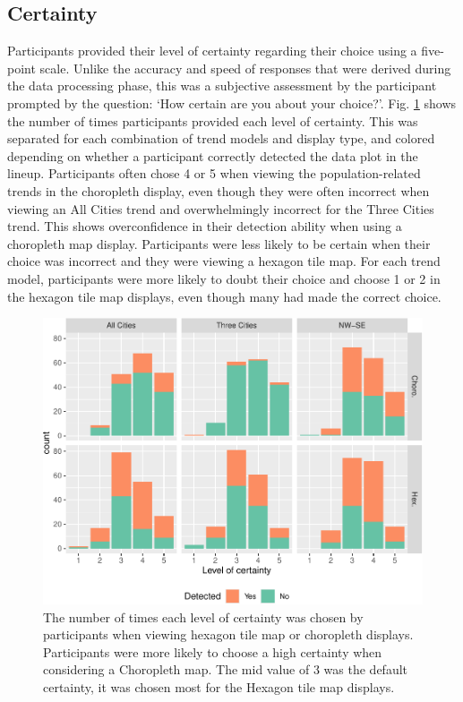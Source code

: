 \documentclass[times, doublespace]{anzsauth}
\begin{document}
\subsection{Certainty}\label{certainty}

Participants provided their level of certainty regarding their choice
using a five-point scale. Unlike the accuracy and speed of responses
that were derived during the data processing phase, this was a
subjective assessment by the participant prompted by the question: `How
certain are you about your choice?'. Fig. \ref{fig:certainty} shows the
number of times participants provided each level of certainty. This was
separated for each combination of trend models and display type, and
colored depending on whether a participant correctly detected the data
plot in the lineup. Participants often chose 4 or 5 when viewing the
population-related trends in the choropleth display, even though they
were often incorrect when viewing an All Cities trend and overwhelmingly
incorrect for the Three Cities trend. This shows overconfidence in their
detection ability when using a choropleth map display. Participants were
less likely to be certain when their choice was incorrect and they were
viewing a hexagon tile map. For each trend model, participants were more
likely to doubt their choice and choose 1 or 2 in the hexagon tile map
displays, even though many had made the correct choice.

\begin{figure}
\includegraphics[width=1\linewidth]{paper_files/figure-latex/certainty-1} \caption{The number of times each level of certainty was chosen by participants when viewing hexagon tile map or choropleth displays. Participants were more likely to choose a high certainty when considering a Choropleth map. The mid value of 3 was the default certainty, it was chosen most for the Hexagon tile map displays.}\label{fig:certainty}
\end{figure}
\end{document}
